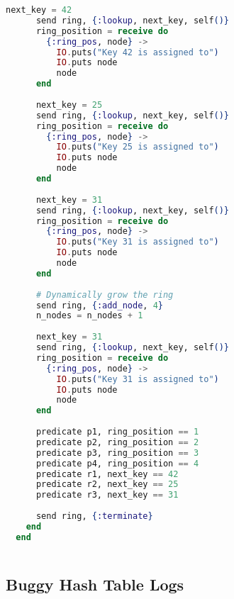 \begin{lstlisting}[language=Elixir, xleftmargin=.1\linewidth]
      next_key = 42
      send ring, {:lookup, next_key, self()}
      ring_position = receive do
        {:ring_pos, node} ->
          IO.puts("Key 42 is assigned to")
          IO.puts node
          node
      end
  
      next_key = 25
      send ring, {:lookup, next_key, self()}
      ring_position = receive do
        {:ring_pos, node} ->
          IO.puts("Key 25 is assigned to")
          IO.puts node
          node
      end
  
      next_key = 31
      send ring, {:lookup, next_key, self()}
      ring_position = receive do
        {:ring_pos, node} ->
          IO.puts("Key 31 is assigned to")
          IO.puts node
          node
      end
  
      # Dynamically grow the ring
      send ring, {:add_node, 4}
      n_nodes = n_nodes + 1
  
      next_key = 31
      send ring, {:lookup, next_key, self()}
      ring_position = receive do
        {:ring_pos, node} ->
          IO.puts("Key 31 is assigned to")
          IO.puts node
          node
      end
  
      predicate p1, ring_position == 1
      predicate p2, ring_position == 2
      predicate p3, ring_position == 3
      predicate p4, ring_position == 4
      predicate r1, next_key == 42
      predicate r2, next_key == 25
      predicate r3, next_key == 31
  
      send ring, {:terminate}
    end
  end
  
\end{lstlisting}
  
\subsection{Buggy Hash Table Logs}

